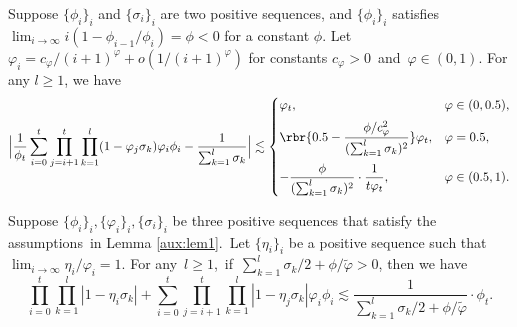 \begin{lemma}\label{aux:lem2}
Suppose $\{\phi_i\}_i$ and $\{\sigma_i\}_i$ are two positive sequences, and $\{\phi_i\}_{i}$ satisfies $\lim_{i\rightarrow \infty} i(1 - \phi_{i-1}/\phi_i) = \phi<0$ for a constant $\phi$. Let $\varphi_i = c_{\varphi}/(i+1)^\varphi + o(1/(i+1)^{\varphi})$ for constants $c_{\varphi}>0$~and~$\varphi\in (0,1)$. For any $l \geq 1$, we have
\begin{equation*}
\Big|\frac{1}{\phi_t}\sum_{i=0}^{t}\prod_{j = i+1}^t\prod_{k=1}^{l}(1-\varphi_j\sigma_k)\varphi_i\phi_i - \frac{1}{\sum_{k=1}^{l}\sigma_k}\Big| \lesssim 
\begin{dcases}
\varphi_t,  & \varphi \in(0,0.5),\\[2pt]
\rbr{0.5-\frac{\phi/c_{\varphi}^2}{(\sum_{k=1}^l\sigma_k)^2}}\varphi_t, & \varphi =0.5,\\[2pt]
-\frac{\phi}{(\sum_{k=1}^l\sigma_k)^2} \cdot \frac{1}{t\varphi_t},  & \varphi \in(0.5,1).
\end{dcases}
\end{equation*}
\end{lemma}

\begin{lemma}\label{aux:lem5}
Suppose $\{\phi_i\}_i,\{\varphi_i\}_i,\{\sigma_i\}_i$ be three positive sequences that satisfy the assumptions~in Lemma \ref{aux:lem1}.~Let $\{\eta_i\}_i$ be a positive sequence such that $\lim_{i\rightarrow\infty}\eta_i/\varphi_i =1$. For any~\mbox{$l\geq 1$},~if~$\sum_{k=1}^l\sigma_k/2 + \phi/\tilde{\varphi}>0$, then we have
\begin{equation*}
\prod_{i=0}^t \prod_{k=1}^l |1-\eta_i\sigma_k|  + \sum_{i=0}^t \prod_{j=i+1}^t \prod_{k=1}^l |1-\eta_j \sigma_k| \varphi_i \phi_i \lesssim \frac{1}{\sum_{k=1}^l\sigma_k/2 + \phi/\tilde{\varphi}}\cdot \phi_t.
\end{equation*}
\end{lemma}



